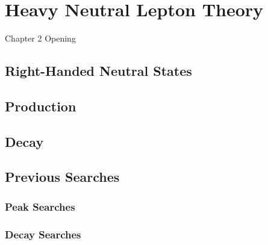 
\chapter{Heavy Neutral Lepton Theory}

\ifpdf
    \graphicspath{{Chapter2/Figs/Raster/}{Chapter2/Figs/PDF/}{Chapter2/Figs/}}
\else
    \graphicspath{{Chapter2/Figs/Vector/}{Chapter2/Figs/}}
\fi


Chapter 2 Opening

\section{Right-Handed Neutral States}

\section{Production}

\section{Decay}

\section{Previous Searches}

\subsection{Peak Searches}

\subsection{Decay Searches}
